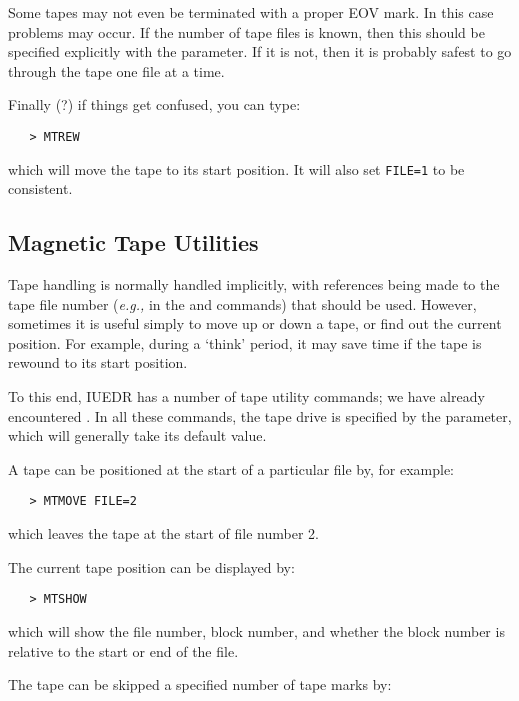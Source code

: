 Some tapes may not even be terminated with a proper EOV mark.  In this case
problems may occur.  If the number of tape files is known, then this should be
specified explicitly with the 
 parameter.  If it is not, then it is
probably safest to go through the tape one file at a time.

Finally (?) if things get confused, you can type:

\begin{verbatim}
   > MTREW
\end{verbatim}

which will move the tape to its start position.  It will also set
\verb+FILE=1+ to be consistent.


\subsection{Magnetic Tape Utilities}

Tape handling is normally handled implicitly, with references being made to
the tape file number ({\it{e.g.,}} in the
 and
 commands) that
should be used.  However, sometimes it is useful simply to move up or down
a tape, or find out the current position.  For example, during a `think'
period, it may save time if the tape is rewound to its start position.

To this end, IUEDR has a number of tape utility commands; we have already
encountered \@.  In all these commands, the 
tape drive is specified by the  parameter, 
which will generally take its default value.

A tape can be positioned at the start of a particular file by, for example:

\begin{verbatim}
   > MTMOVE FILE=2
\end{verbatim}

which leaves the tape at the start of file number 2.

The current tape position can be displayed by:

\begin{verbatim}
   > MTSHOW
\end{verbatim}

which will show the file number, block number, and whether the block number
is relative to the start or end of the file.

The tape can be skipped a specified number of tape marks by:

